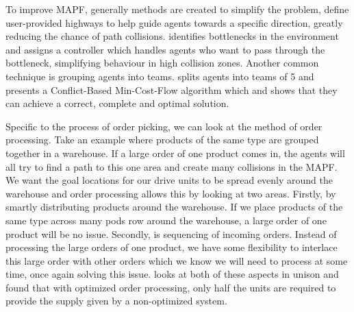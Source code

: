 \documentclass[a4paper,11pt]{article}
\begin{document}
To improve MAPF, generally methods are created to simplify the problem, \cite{cohen2016bounded} define user-provided highways to help guide agents towards a specific direction, greatly reducing the chance of path collisions. \cite{wilt2014spatially} identifies bottlenecks in the environment and assigns a controller which handles agents who want to pass through the bottleneck, simplifying behaviour in high collision zones. Another common technique is grouping agents into teams. \cite{ma2016optimal} splits agents into teams of 5 and presents a Conflict-Based Min-Cost-Flow algorithm which and shows that they can achieve a correct, complete and optimal solution.


Specific to the process of order picking, we can look at the method of order processing. Take an example where products of the same type are grouped together in a warehouse. If a large order of one product comes in, the agents will all try to find a path to this one area and create many collisions in the MAPF. We want the goal locations for our drive units to be spread evenly around the warehouse and order processing allows this by looking at two areas. Firstly, by smartly distributing products around the warehouse. If we place products of the same type across many pods row around the warehouse, a large order of one product will be no issue. Secondly, is sequencing of incoming orders. Instead of processing the large orders of one product, we have some flexibility to interlace this large order with other orders which we know we will need to process at some time, once again solving this issue. \cite{boysen2017parts} looks at both of these aspects in unison and found that with optimized order processing, only half the units are required to provide the supply given by a non-optimized system.

\end{document}

